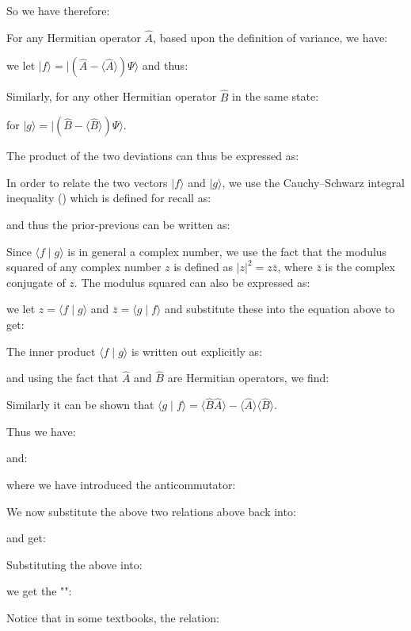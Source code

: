 	So we have therefore:
	
	For any Hermitian operator $\hat {A}$, based upon the definition of variance, we have:
	
	we let $|f\rangle =|({\hat {A}}-\langle {\hat {A}}\rangle )\Psi \rangle$ and thus:
	
	Similarly, for any other Hermitian operator $\hat{B}$ in the same state:
	
	for $|g\rangle =|({\hat {B}}-\langle {\hat {B}}\rangle )\Psi \rangle $.
	
	The product of the two deviations can thus be expressed as:
	
	In order to relate the two vectors $ |f\rangle$  and $|g\rangle$, we use the Cauchy–Schwarz integral inequality () which is defined for recall as:
	
	and thus the prior-previous can be written as:
	
	Since $\langle f\mid g\rangle$ is in general a complex number, we use the fact that the modulus squared of any complex number $z$ is defined as $|z|^{2}=z\bar{z}$, where $\bar{z}$ is the complex conjugate of $z$. The modulus squared can also be expressed as:
	
	we let $z=\langle f\mid g\rangle$ and $\bar{z}=\langle g\mid f\rangle$ and substitute these into the equation above to get:
	
	The inner product $\langle f\mid g\rangle$ is written out explicitly as:
	
	and using the fact that $\hat{A}$ and $\hat{B}$ are Hermitian operators, we find:
	
	Similarly it can be shown that $\langle g\mid f\rangle =\langle {\hat {B}}{\hat {A}}\rangle -\langle {\hat {A}}\rangle \langle {\hat {B}}\rangle$.

	Thus we have:
	
	and:
	
	where we have introduced the anticommutator:
	
	We now substitute the above two relations above back into:
	
	and get:
	
	Substituting the above into:
	
	 we get the "":
	 
	Notice that in some textbooks, the relation:
	
